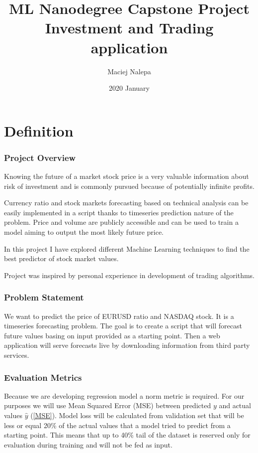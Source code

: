 \documentclass[a4paper,12pt]{article}
\title{ML Nanodegree Capstone Project\\Investment and Trading application}
\author{Maciej Nalepa}
\date{2020 January}
\begin{document}
\maketitle

\part{Definition}
\section*{Project Overview}
Knowing the future of a market stock price is a very valuable information about risk of investment and is commonly pursued because of potentially infinite profits.

Currency ratio and stock markets forecasting based on technical analysis can be easily implemented in a script thanks to timeseries prediction nature of the problem. Price and volume are publicly accessible and can be used to train a model aiming to output the most likely future price.

In this project I have explored different Machine Learning techniques to find the best predictor of stock market values.

Project was inspired by personal experience in development of trading algorithms.

\section*{Problem Statement}
We want to predict the price of EURUSD ratio and NASDAQ stock. It is a timeseries forecasting problem. The goal is to create a script that will forecast future values basing on input provided as a starting point. Then a web application will serve forecasts live by downloading information from third party services.

\section*{Evaluation Metrics}
Because we are developing regression model a norm metric is required. For our purposes we will use Mean Squared Error (MSE) between predicted $y$ and actual values $\hat{y}$ (\ref{MSE}). Model loss will be calculated from validation set that will be less or equal 20\% of the actual values that a model tried to predict from a starting point. This means that up to 40\% tail of the dataset is reserved only for evaluation during training and will not be fed as input.
\end{document}
